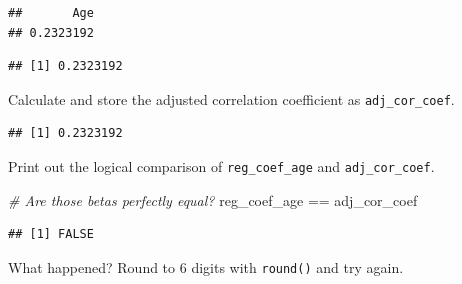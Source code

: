 \documentclass[
]{book}
\newenvironment{Shaded}{\begin{snugshade}}{\end{snugshade}}
\newcommand{\CommentTok}[1]{\textcolor[rgb]{0.56,0.35,0.01}{\textit{#1}}}
\newcommand{\DecValTok}[1]{\textcolor[rgb]{0.00,0.00,0.81}{#1}}
\newcommand{\FunctionTok}[1]{\textcolor[rgb]{0.00,0.00,0.00}{#1}}
\newcommand{\NormalTok}[1]{#1}
\newcommand{\OtherTok}[1]{\textcolor[rgb]{0.56,0.35,0.01}{#1}}
\newcommand{\SpecialCharTok}[1]{\textcolor[rgb]{0.00,0.00,0.00}{#1}}
\begin{document}
\begin{verbatim}
##       Age 
## 0.2323192
\end{verbatim}

\begin{Shaded}
\end{Shaded}

\begin{verbatim}
## [1] 0.2323192
\end{verbatim}

Calculate and store the adjusted correlation coefficient as \texttt{adj\_cor\_coef}.

\begin{Shaded}
\end{Shaded}

\begin{verbatim}
## [1] 0.2323192
\end{verbatim}

Print out the logical comparison of \texttt{reg\_coef\_age} and \texttt{adj\_cor\_coef}.

\begin{Shaded}
\begin{Highlighting}[]
\CommentTok{\# Are those betas perfectly equal?}
\NormalTok{reg\_coef\_age }\SpecialCharTok{==}\NormalTok{ adj\_cor\_coef}
\end{Highlighting}
\end{Shaded}

\begin{verbatim}
## [1] FALSE
\end{verbatim}

What happened? Round to 6 digits with \texttt{round()} and try again.
\end{document}
